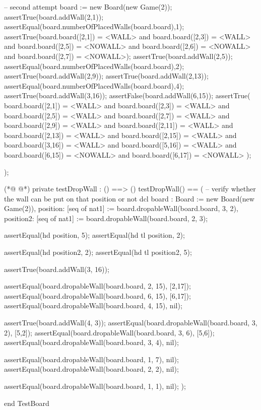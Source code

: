 \begin{vdmpp}[breaklines=true]
  -- second attempt
  board := new Board(new Game(2));
  assertTrue(board.addWall(2,1));
  assertEqual(board.numberOfPlacedWalls(board.board),1);
  assertTrue(board.board([2,1]) = <WALL> and board.board([2,3]) = <WALL> and board.board([2,5]) = <NOWALL> and board.board([2,6]) = <NOWALL> and board.board([2,7]) = <NOWALL>);
  assertTrue(board.addWall(2,5));
  assertEqual(board.numberOfPlacedWalls(board.board),2);
  assertTrue(board.addWall(2,9));
  assertTrue(board.addWall(2,13));
  assertEqual(board.numberOfPlacedWalls(board.board),4);
  assertTrue(board.addWall(3,16));
  assertFalse(board.addWall(6,15));
  assertTrue(
   board.board([2,1]) = <WALL> and board.board([2,3]) = <WALL> and board.board([2,5]) = <WALL> and
   board.board([2,7]) = <WALL> and board.board([2,9]) = <WALL> and board.board([2,11]) = <WALL> and
   board.board([2,13]) = <WALL> and board.board([2,15]) = <WALL> and board.board([3,16]) = <WALL> and   
   board.board([5,16]) = <WALL> and board.board([6,15]) = <NOWALL> and board.board([6,17]) = <NOWALL>   
  );
  
 );
 
(*@
\label{testDropWall:96}
@*)
 private testDropWall : () ==> ()
 testDropWall() ==
 (
  -- verify whether the wall can be put on that position or not
  dcl 
  board : Board := new Board(new Game(2)),
  position: [seq of nat1] := board.dropableWall(board.board, 3, 2),
  position2: [seq of nat1] := board.dropableWall(board.board, 2, 3);
  
  assertEqual(hd position, 5);
  assertEqual(hd tl position, 2);
  
  assertEqual(hd position2, 2);
  assertEqual(hd tl position2, 5);
  
  assertTrue(board.addWall(3, 16));
  
  assertEqual(board.dropableWall(board.board, 2, 15), [2,17]);
  assertEqual(board.dropableWall(board.board, 6, 15), [6,17]);
  assertEqual(board.dropableWall(board.board, 4, 15), nil);
  
  assertTrue(board.addWall(4, 3));
  assertEqual(board.dropableWall(board.board, 3, 2), [5,2]);
  assertEqual(board.dropableWall(board.board, 3, 6), [5,6]);
  assertEqual(board.dropableWall(board.board, 3, 4), nil);
  
  assertEqual(board.dropableWall(board.board, 1, 7), nil);
  assertEqual(board.dropableWall(board.board, 2, 2), nil);
   
  assertEqual(board.dropableWall(board.board, 1, 1), nil);
 );
 
end TestBoard
\end{vdmpp}
